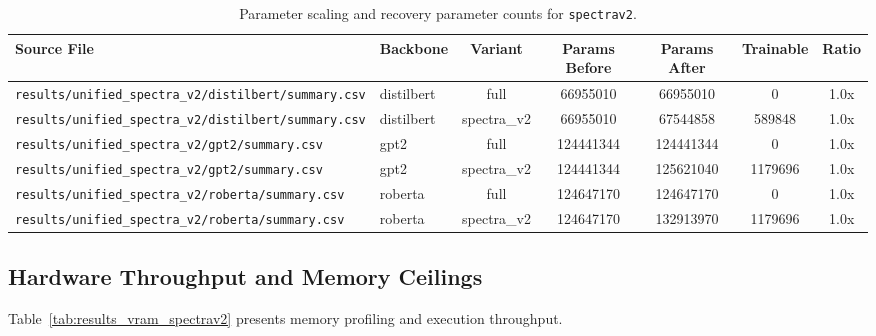 \begin{table}[t]
\centering
\small
\begin{tabular}{llccccc}
\toprule
\textbf{Source File} & \textbf{Backbone} & \textbf{Variant} & \textbf{Params Before} & \textbf{Params After} & \textbf{Trainable} & \textbf{Ratio} \\
\midrule
\texttt{results/unified\_spectra\_v2/distilbert/summary.csv} & distilbert & full & 66955010 & 66955010 & 0 & 1.0x \\
\texttt{results/unified\_spectra\_v2/distilbert/summary.csv} & distilbert & spectra\_v2 & 66955010 & 67544858 & 589848 & 1.0x \\
\texttt{results/unified\_spectra\_v2/gpt2/summary.csv} & gpt2 & full & 124441344 & 124441344 & 0 & 1.0x \\
\texttt{results/unified\_spectra\_v2/gpt2/summary.csv} & gpt2 & spectra\_v2 & 124441344 & 125621040 & 1179696 & 1.0x \\
\texttt{results/unified\_spectra\_v2/roberta/summary.csv} & roberta & full & 124647170 & 124647170 & 0 & 1.0x \\
\texttt{results/unified\_spectra\_v2/roberta/summary.csv} & roberta & spectra\_v2 & 124647170 & 132913970 & 1179696 & 1.0x \\
\bottomrule
\end{tabular}
\caption{Parameter scaling and recovery parameter counts for \texttt{spectrav2}.}
\label{tab:results_params_spectrav2}
\end{table}

\subsection{Hardware Throughput and Memory Ceilings}
Table~\ref{tab:results_vram_spectrav2} presents memory profiling and execution throughput.

